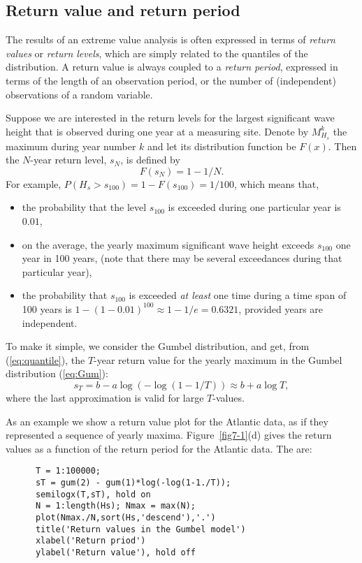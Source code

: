 \subsection{Return value and return period }\label{subsec:returnvaluesWeibGumb}
The results of an extreme value analysis is often expressed in terms of
{\em return values} or {\em return levels},
which are simply related to the quantiles of the distribution.
A return value is always coupled to a {\em return period},
expressed in terms of the length of an observation period, or the
number of (independent) observations of a random variable.

Suppose we are interested in the return levels for the largest significant
wave height that is observed during one year at a measuring site. Denote by
$M_{H_s}^k$ the maximum during year number $k$ and let its distribution
function be $F(x)$. Then the $N$-year return level, $s_{N}$, is defined by
\begin{equation}
F(s_{N}) = 1 - 1/N.
\label{eq:quantile}
\end{equation}
For example, $P(H_s > s_{100}) = 1 - F(s_{100}) = 1/100$, which means that,
\begin{itemize}\setlength\itemsep{-1mm}
\item
the probability that the level
$s_{100}$ is exceeded during one particular year is $0.01$,
\item
on the average, the yearly maximum significant wave height
exceeds $s_{100}$ one year in 100 years,
(note that there may be several exceedances
during that particular year),
\item
the probability that  $s_{100}$ is exceeded {\em at least} one
time during a time span of 100 years is $1-(1-0.01)^{100} \approx
1-1/e = 0.6321$,
provided years are independent.
\end{itemize}

To make it simple, we consider the Gumbel distribution, and
get, from (\ref{eq:quantile}), the $T$-year return value for the
yearly maximum in the Gumbel distribution (\ref{eq:Gum}):
\begin{equation}
s_T = b - a \log (- \log (1 - 1/T)) \approx b + a \log T,
\label{eq:GumbelreturnA}
\end{equation}
where the last approximation is valid for large $T$-values.

As an example we show a return value plot for the Atlantic data,
as if they represented a sequence of yearly maxima.
Figure~\ref{fig7-1}(d) gives the
return values as a function of the return period for the Atlantic data.
The  are:
{\small
\begin{verbatim}
      T = 1:100000;
      sT = gum(2) - gum(1)*log(-log(1-1./T));
      semilogx(T,sT), hold on
      N = 1:length(Hs); Nmax = max(N);
      plot(Nmax./N,sort(Hs,'descend'),'.')
      title('Return values in the Gumbel model')
      xlabel('Return priod')
      ylabel('Return value'), hold off
\end{verbatim}
}

